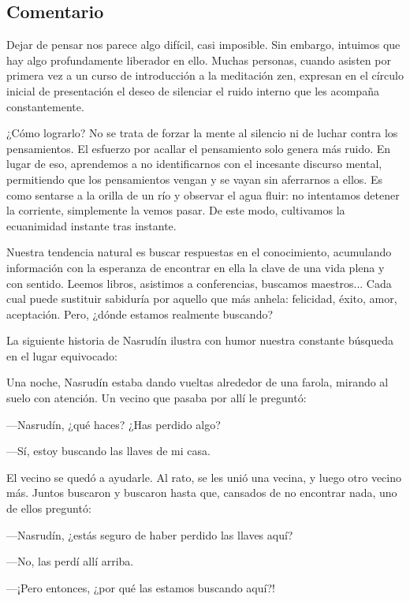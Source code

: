 \documentclass[
  a5paperpaper,
]{article}
\begin{document}
\hfill\break

\hypertarget{comentario-15}{%
\subsection{Comentario}\label{comentario-15}}

Dejar de pensar nos parece algo difícil, casi imposible. Sin embargo,
intuimos que hay algo profundamente liberador en ello. Muchas personas,
cuando asisten por primera vez a un curso de introducción a la
meditación zen, expresan en el círculo inicial de presentación el deseo
de silenciar el ruido interno que les acompaña constantemente.

¿Cómo lograrlo? No se trata de forzar la mente al silencio ni de luchar
contra los pensamientos. El esfuerzo por acallar el pensamiento solo
genera más ruido. En lugar de eso, aprendemos a no identificarnos con el
incesante discurso mental, permitiendo que los pensamientos vengan y se
vayan sin aferrarnos a ellos. Es como sentarse a la orilla de un río y
observar el agua fluir: no intentamos detener la corriente, simplemente
la vemos pasar. De este modo, cultivamos la ecuanimidad instante tras
instante.

Nuestra tendencia natural es buscar respuestas en el conocimiento,
acumulando información con la esperanza de encontrar en ella la clave de
una vida plena y con sentido. Leemos libros, asistimos a conferencias,
buscamos maestros... Cada cual puede sustituir sabiduría por aquello que
más anhela: felicidad, éxito, amor, aceptación. Pero, ¿dónde estamos
realmente buscando?

La siguiente historia de Nasrudín ilustra con humor nuestra constante
búsqueda en el lugar equivocado:

Una noche, Nasrudín estaba dando vueltas alrededor de una farola,
mirando al suelo con atención. Un vecino que pasaba por allí le
preguntó:

---Nasrudín, ¿qué haces? ¿Has perdido algo?

---Sí, estoy buscando las llaves de mi casa.

El vecino se quedó a ayudarle. Al rato, se les unió una vecina, y luego
otro vecino más. Juntos buscaron y buscaron hasta que, cansados de no
encontrar nada, uno de ellos preguntó:

---Nasrudín, ¿estás seguro de haber perdido las llaves aquí?

---No, las perdí allí arriba.

---¡Pero entonces, ¿por qué las estamos buscando aquí?!
\end{document}
